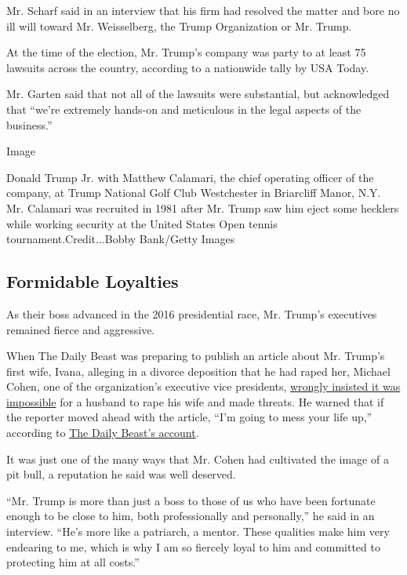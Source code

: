 Mr. Scharf said in an interview that his firm had resolved the matter
and bore no ill will toward Mr. Weisselberg, the Trump Organization or
Mr. Trump.

At the time of the election, Mr. Trump's company was party to at least
75 lawsuits across the country, according to a nationwide tally by USA
Today.

Mr. Garten said that not all of the lawsuits were substantial, but
acknowledged that ``we're extremely hands-on and meticulous in the legal
aspects of the business.''

Image

Donald Trump Jr. with Matthew Calamari, the chief operating officer of
the company, at Trump National Golf Club Westchester in Briarcliff
Manor, N.Y. Mr. Calamari was recruited in 1981 after Mr. Trump saw him
eject some hecklers while working security at the United States Open
tennis tournament.Credit...Bobby Bank/Getty Images

\hypertarget{formidable-loyalties}{%
\subsection{Formidable Loyalties}\label{formidable-loyalties}}

As their boss advanced in the 2016 presidential race, Mr. Trump's
executives remained fierce and aggressive.

When The Daily Beast was preparing to publish an article about Mr.
Trump's first wife, Ivana, alleging in a divorce deposition that he had
raped her, Michael Cohen, one of the organization's executive vice
presidents,
\href{https://www.nytimes.com/politics/first-draft/2015/07/28/donald-trump-aide-apologizes-for-saying-you-cant-rape-your-spouse/?_r=0}{wrongly
insisted it was impossible} for a husband to rape his wife and made
threats. He warned that if the reporter moved ahead with the article,
``I'm going to mess your life up,'' according to
\href{http://www.thedailybeast.com/articles/2015/07/27/ex-wife-donald-trump-made-feel-violated-during-sex.html}{The
Daily Beast's account}.

It was just one of the many ways that Mr. Cohen had cultivated the image
of a pit bull, a reputation he said was well deserved.

``Mr. Trump is more than just a boss to those of us who have been
fortunate enough to be close to him, both professionally and
personally,'' he said in an interview. ``He's more like a patriarch, a
mentor. These qualities make him very endearing to me, which is why I am
so fiercely loyal to him and committed to protecting him at all costs.''

